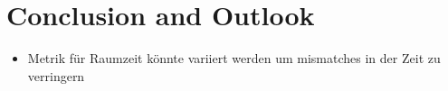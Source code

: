 \chapter{Conclusion and Outlook}
%

\begin{itemize}
  \item Metrik für Raumzeit könnte variiert werden um mismatches in der Zeit zu verringern
\end{itemize}
